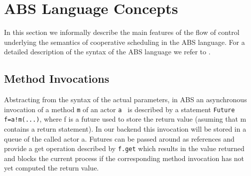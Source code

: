 

\section{ABS Language Concepts}
\label{lang}
In this section we informally describe the main features of the flow of control
underlying the semantics of cooperative scheduling in the  ABS language.
For a detailed description of the syntax of the ABS language we refer to \cite{abs}.

\subsection{Method Invocations}\label{amc}
Abstracting from the syntax of the actual parameters,
in ABS  an  asynchronous invocation of a method \lstinline|m| of an actor \lstinline|a | is described by a  statement
\lstinline|Future f=a!m(...)|, where f is a future used to store the return value
(asuming that  m contains a return statement).
In our backend this invocation will be stored in a queue of the called actor a.
Futures can be passed around as references and provide a get operation
described by \lstinline|f.get| which results in the value returned and blocks
the current process if the corresponding method invocation has not yet computed
the return value.

